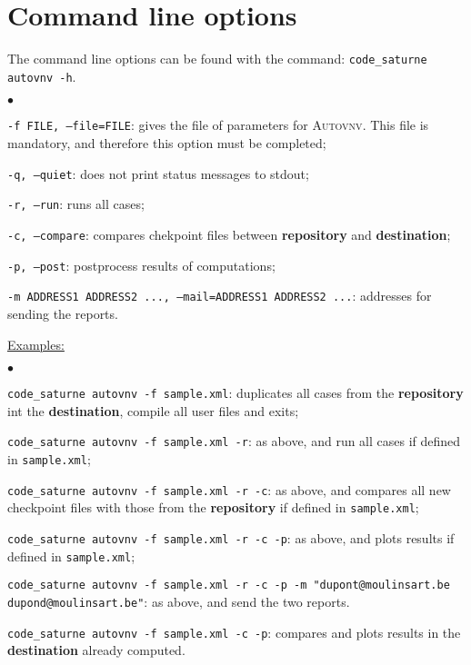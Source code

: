 \documentclass[a4paper,10pt,twoside]{article}
\begin{document}
\section{Command line options}

The command line options can be found with the command: \texttt{code\_saturne autovnv -h}.

\begin{list}{$\bullet$}{}
\item \texttt{-f FILE, --file=FILE}: gives the file of parameters for \textsc{Autovnv}.
This file is mandatory, and therefore this option must be completed;
\item \texttt{-q, --quiet}: does not print status messages to stdout;
\item \texttt{-r, --run}: runs all cases;
\item \texttt{-c, --compare}: compares chekpoint files between \textbf{repository} and \textbf{destination};
\item \texttt{-p, --post}: postprocess results of computations;
\item \texttt{-m ADDRESS1 ADDRESS2 ..., --mail=ADDRESS1 ADDRESS2 ...}: addresses for sending the reports.
\end{list}

\underline{Examples:}

\begin{list}{$\bullet$}{}
\item \texttt{code\_saturne autovnv -f sample.xml}: duplicates all cases from the \textbf{repository}
int the \textbf{destination}, compile all user files and exits;
\item \texttt{code\_saturne autovnv -f sample.xml -r}: as above, and run all cases if defined
in \texttt{sample.xml};
\item \texttt{code\_saturne autovnv -f sample.xml -r -c}: as above, and compares all new checkpoint files
with those from the \textbf{repository} if defined in \texttt{sample.xml};
\item \texttt{code\_saturne autovnv -f sample.xml -r -c -p}: as above, and plots results
if defined in \texttt{sample.xml};
\item \texttt{code\_saturne autovnv -f sample.xml -r -c -p -m "dupont@moulinsart.be dupond@moulinsart.be"}: as above,
and send the two reports.
\item \texttt{code\_saturne autovnv -f sample.xml -c -p}: compares and plots results in the \textbf{destination}
already computed.
\end{list}
\end{document}
